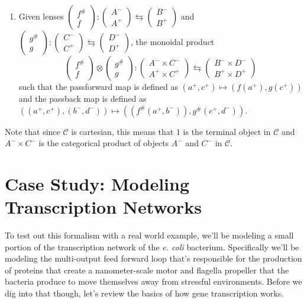 \documentclass[12pt]{article}
\newcounter{examp}
\begin{document}
\begin{definition*}{}{}
\begin{enumerate}
        \item Given lenses $\begin{pmatrix}f^{\#}\\f\end{pmatrix}:\begin{pmatrix}A^-\\A^+\end{pmatrix}\leftrightarrows\begin{pmatrix}B^-\\B^+\end{pmatrix}$
              and $\begin{pmatrix}g^{\#}\\g\end{pmatrix}:\begin{pmatrix}C^-\\C^+\end{pmatrix}\leftrightarrows\begin{pmatrix}D^-\\D^+\end{pmatrix}$, the monoidal product
              $$\begin{pmatrix}f^{\#}\\f\end{pmatrix} \otimes \begin{pmatrix}g^{\#}\\g\end{pmatrix}:\begin{pmatrix}A^- \times C^-\\A^+ \times C^+\end{pmatrix}\leftrightarrows\begin{pmatrix}B^- \times D^-\\B^+ \times D^+\end{pmatrix}$$
              such that the passforward map is defined as $(a^+, c^+) \mapsto (f(a^+), g(c^+))$ and the passback map is defined as $((a^+, c^+), (b^-, d^-)) \mapsto ((f^\#(a^+, b^-)), g^\#(c^+, d^-))$.
    \end{enumerate}

    Note that since $\mathcal{C}$ is cartesian, this means that $1$ is the terminal object in $\mathcal{C}$ and $A^- \times C^-$ is the categorical product of objects $A^-$ and $C^-$ in $\mathcal{C}$.
\end{definition*}





\section*{Case Study: Modeling Transcription Networks}
To test out this formalism with a real world example, we'll be modeling a small portion of the transcription network of the \textit{e. coli} bacterium.
Specifically we'll be modeling the multi-output feed forward loop that's responsible for the production of proteins that create a nanometer-scale motor and flagella propeller that the bacteria produce to move themselves away from stressful environments.
Before we dig into that though, let's review the basics of how gene transcription works.
\end{document}
